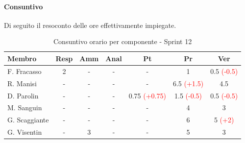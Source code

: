 \documentclass[a4paper,12pt]{article}
\begin{document}
\paragraph{Consuntivo}
Di seguito il resoconto delle ore effettivamente impiegate.
\begin{table}[H]
    \centering
    \renewcommand{\arraystretch}{1.4}
    \footnotesize
    \begin{tabularx}{\textwidth}{|l|C|C|C|C|C|C|}
        \hline
        \textbf{Membro} & \textbf{Resp} & \textbf{Amm} & \textbf{Anal} & \textbf{Pt} & \textbf{Pr} & \textbf{Ver} \\
        \hline
        F. Fracasso & 2 & - & - & - & 1 & 0.5 \textcolor{red}{(-0.5)} \\
        \hline
        R. Manisi & - & - & - & - & 6.5 \textcolor{red}{(+1.5)} & 4.5 \\
        \hline
        D. Parolin & - & - & - & 0.75 \textcolor{red}{(+0.75)} & 1.5 \textcolor{red}{(-0.5)} & 0.5 \textcolor{red}{(-0.5)}\\
        \hline
        M. Sanguin & - & - & - & - & 4 & 3 \\
        \hline
        G. Scaggiante & - & - & - & - & 6 & 5 \textcolor{red}{(+2)} \\
        \hline
        G. Visentin & - & 3 & - & - & 5 & 3 \\
        \hline
    \end{tabularx}
    \caption{Consuntivo orario per componente - Sprint 12}
    \label{tab:consuntivo_sprint12}
\end{table}
\end{document}

